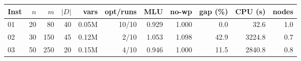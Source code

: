 \begin{tabular}{lrrrrrrrrrr}
\toprule
Inst & $n$ & $m$ & $|D|$ & vars & opt/runs & MLU & no-wp & gap (\%) & CPU (s) & nodes \\
\midrule
01 & 20 & 80 & 40 & 0.05M & 10/10 & 0.929 & 1.000 & 0.0 & 32.6 & 1.0 \\
02 & 30 & 150 & 45 & 0.12M & 2/10 & 1.053 & 1.098 & 42.9 & 3224.8 & 0.7 \\
03 & 50 & 250 & 20 & 0.15M & 4/10 & 0.946 & 1.000 & 11.5 & 2840.8 & 0.8 \\
\bottomrule
\end{tabular}
